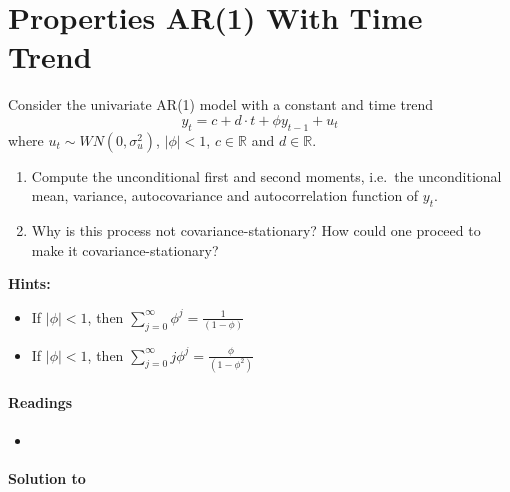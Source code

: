\section[Properties AR{(1)} With Time Trend]{Properties AR{(1)} With Time Trend\label{ex:PropertiesAR1TimeTrend}}

Consider the univariate AR{(1)} model with a constant and time trend
\[ y_t = c + d\cdot t + \phi y_{t-1} + u_t\]
where \(u_t \sim WN(0,\sigma_u^2)\), \(|\phi|<1\), \(c \in \mathbb{R}\) and \(d \in \mathbb{R}\).
\begin{enumerate}
\item
Compute the unconditional first and second moments,
  i.e.\ the unconditional mean, variance, autocovariance and autocorrelation function of \(y_t\).

\item
Why is this process not covariance-stationary?
How could one proceed to make it covariance-stationary?
\end{enumerate}

\textbf{Hints:}
\begin{itemize}
\item If \(|\phi|<1\), then \(\sum_{j=0}^{\infty} \phi^j = \frac{1}{(1-\phi)}\)
\item If \(|\phi|<1\), then \(\sum_{j=0}^{\infty} j \phi^j = \frac{\phi}{(1-\phi^2)}\)
\end{itemize}

\paragraph{Readings}
\begin{itemize}
\item \textcite{Lutkepohl_2004_UnivariateTimeSeries}
\end{itemize}

\begin{solution}\textbf{Solution to }
\ifDisplaySolutions%

\fi
\newpage
\end{solution}